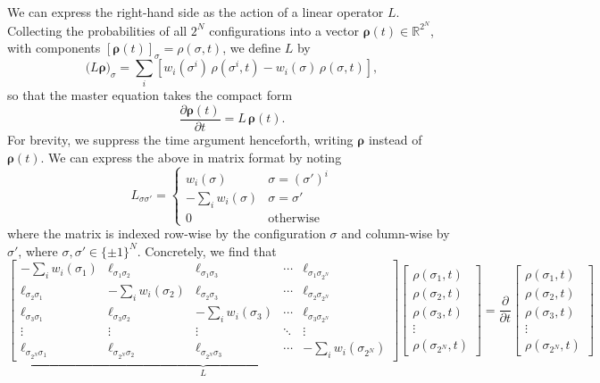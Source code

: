 \documentclass[12pt]{article}
\theoremstyle{definition}
\theoremstyle{remark}
\begin{document}
We can express the right-hand side as the action of a linear operator $L$. Collecting the probabilities of all $2^N$ configurations into a vector $\boldsymbol{\rho}(t) \in \mathbb{R}^{2^N}$, with components $[\boldsymbol{\rho}(t)]_\sigma = \rho(\sigma, t)$, we define $L$ by
\[
\big(L\boldsymbol{\rho}\big)_\sigma = \sum_i \left[ w_i(\sigma^i)\, \rho(\sigma^i, t) - w_i(\sigma)\, \rho(\sigma, t) \right],
\]
so that the master equation takes the compact form
\[
\frac{\partial \boldsymbol{\rho}(t)}{\partial t} = L\, \boldsymbol{\rho}(t).
\]
For brevity, we suppress the time argument henceforth, writing $\boldsymbol{\rho}$ instead of $\boldsymbol{\rho}(t)$. We can express the above in matrix format by noting
\[
L_{\sigma\sigma'} = \begin{cases}
    w_i(\sigma) & \sigma = (\sigma')^i \\ 
    - \sum_i w_i(\sigma) & \sigma = \sigma' \\
    0 & \text{otherwise}
\end{cases}
\]
where the matrix is indexed row-wise by the configuration $\sigma$ and column-wise by $\sigma'$, where $\sigma, \sigma' \in \{\pm 1\}^N$. Concretely, we find that
\[
\underbrace{
\begin{bmatrix}
-\displaystyle\sum_i w_i(\sigma_1) & \ell_{\sigma_1 \sigma_2} & \ell_{\sigma_1 \sigma_3} & \cdots & \ell_{\sigma_1 \sigma_{2^N}} \\[10pt]
\ell_{\sigma_2 \sigma_1} & -\displaystyle\sum_i w_i(\sigma_2) & \ell_{\sigma_2 \sigma_3} & \cdots & \ell_{\sigma_2 \sigma_{2^N}} \\[10pt]
\ell_{\sigma_3 \sigma_1} & \ell_{\sigma_3 \sigma_2} & -\displaystyle\sum_i w_i(\sigma_3) & \cdots & \ell_{\sigma_3 \sigma_{2^N}} \\[6pt]
\vdots & \vdots & \vdots & \ddots & \vdots \\[4pt]
\ell_{\sigma_{2^N} \sigma_1} & \ell_{\sigma_{2^N} \sigma_2} & \ell_{\sigma_{2^N} \sigma_3} & \cdots & -\displaystyle\sum_i w_i(\sigma_{2^N})
\end{bmatrix}
}_{L}
\begin{bmatrix}
\rho(\sigma_1, t) \\[8pt]
\rho(\sigma_2, t) \\[8pt]
\rho(\sigma_3, t) \\[6pt]
\vdots \\[4pt]
\rho(\sigma_{2^N}, t)
\end{bmatrix}
=
\frac{\partial}{\partial t}
\begin{bmatrix}
\rho(\sigma_1, t) \\[8pt]
\rho(\sigma_2, t) \\[8pt]
\rho(\sigma_3, t) \\[6pt]
\vdots \\[4pt]
\rho(\sigma_{2^N}, t)
\end{bmatrix}
\]
\end{document}
